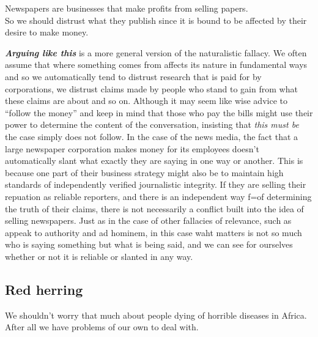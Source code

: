 \documentclass[
  12pt, openany]{book}
\begin{document}
\begin{center}

\begin{argument}

Newspapers are businesses that make profits from selling papers.\\

So we should distrust what they publish since it is bound to be affected by their desire to make money.

\end{argument}

\end{center}

\textbf{\emph{Arguing like this}} is a more general version of the naturalistic fallacy. We often assume that where something comes from affects its nature in fundamental ways and so we automatically tend to distrust research that is paid for by corporations, we distrust claims made by people who stand to gain from what these claims are about and so on. Although it may seem like wise advice to ``follow the money'' and keep in mind that those who pay the bills might use their power to determine the content of the conversation, insisting that \emph{this must be} the case simply does not follow. In the case of the news media, the fact that a large newspaper corporation makes money for its employees doesn't automatically slant what exactly they are saying in one way or another. This is because one part of their business strategy might also be to maintain high standards of independently verified journalistic integrity. If they are selling their repuation as reliable reporters, and there is an independent way f=of determining the truth of their claims, there is not necessarily a conflict built into the idea of selling newspapers. Just as in the case of other fallacies of relevance, such as appeak to authority and ad hominem, in this case waht matters is not so much who is saying something but what is being said, and we can see for ourselves whether or not it is reliable or slanted in any way.

\hypertarget{red-herring}{%
\subsection*{Red herring}\label{red-herring}}


\begin{center}

\begin{argument}

We shouldn't worry that much about people dying of horrible diseases in Africa.\\

After all we have problems of our own to deal with.

\end{argument}

\end{center}
\end{document}
